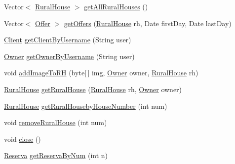 \begin{DoxyCompactItemize}
\item 
Vector$<$ \mbox{\hyperlink{classdomain_1_1_rural_house}{Rural\+House}} $>$ \mbox{\hyperlink{classbusiness_logic_1_1_facade_implementation_w_s_aa6f21ddb40ca6cd752a13e31ff016e7e}{get\+All\+Rural\+Houses}} ()
\item 
Vector$<$ \mbox{\hyperlink{classdomain_1_1_offer}{Offer}} $>$ \mbox{\hyperlink{classbusiness_logic_1_1_facade_implementation_w_s_a7489fb15fdb8206b16daf6ed24fdfea0}{get\+Offers}} (\mbox{\hyperlink{classdomain_1_1_rural_house}{Rural\+House}} rh, Date first\+Day, Date last\+Day)
\item 
\mbox{\hyperlink{classdomain_1_1_client}{Client}} \mbox{\hyperlink{classbusiness_logic_1_1_facade_implementation_w_s_a49e8bd0f75fee0f774c78f1631509a12}{get\+Client\+By\+Username}} (String user)
\item 
\mbox{\hyperlink{classdomain_1_1_owner}{Owner}} \mbox{\hyperlink{classbusiness_logic_1_1_facade_implementation_w_s_a2e7c07eb23b062294ea3f5aaa48285a5}{get\+Owner\+By\+Username}} (String user)
\item 
void \mbox{\hyperlink{classbusiness_logic_1_1_facade_implementation_w_s_aa05fbf6e32c0939508a542b857dce1d1}{add\+Image\+To\+RH}} (byte\mbox{[}$\,$\mbox{]} img, \mbox{\hyperlink{classdomain_1_1_owner}{Owner}} owner, \mbox{\hyperlink{classdomain_1_1_rural_house}{Rural\+House}} rh)
\item 
\mbox{\hyperlink{classdomain_1_1_rural_house}{Rural\+House}} \mbox{\hyperlink{classbusiness_logic_1_1_facade_implementation_w_s_a22945417275898b39f1fcbdd8961b1cf}{get\+Rural\+House}} (\mbox{\hyperlink{classdomain_1_1_rural_house}{Rural\+House}} rh, \mbox{\hyperlink{classdomain_1_1_owner}{Owner}} owner)
\item 
\mbox{\hyperlink{classdomain_1_1_rural_house}{Rural\+House}} \mbox{\hyperlink{classbusiness_logic_1_1_facade_implementation_w_s_a4b08e36f8de023cb541f63a5e772e2be}{get\+Rural\+Houseby\+House\+Number}} (int num)
\item 
void \mbox{\hyperlink{classbusiness_logic_1_1_facade_implementation_w_s_a4d0fe8c220dc334e527a3e7b4cc9edca}{remove\+Rural\+House}} (int num)
\item 
void \mbox{\hyperlink{classbusiness_logic_1_1_facade_implementation_w_s_aaf150e07dd6d71319c6f2f4bf6be1647}{close}} ()
\item 
\mbox{\hyperlink{classdomain_1_1_reserva}{Reserva}} \mbox{\hyperlink{classbusiness_logic_1_1_facade_implementation_w_s_a7b8deff7fb54e2ea7fa884fc13870d6d}{get\+Reserva\+By\+Num}} (int n)
\item 

\end{DoxyCompactItemize}
